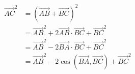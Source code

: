\documentclass[preview]{standalone}
\begin{document}
\begin{align*}
\overrightarrow{AC}^2 &= (\overrightarrow{AB} + \overrightarrow{BC})^2\\&= \overrightarrow{AB}^2 + 2\overrightarrow{AB}\cdot\overrightarrow{BC} + \overrightarrow{BC}^2\\&= \overrightarrow{AB}^2 - 2\overrightarrow{BA}\cdot\overrightarrow{BC} + \overrightarrow{BC}^2\\&= \overrightarrow{AB}^2 -2\cos\left(\overrightarrow{BA},\overrightarrow{BC}\right)+ \overrightarrow{BC}^2\\
\end{align*}
\end{document}
